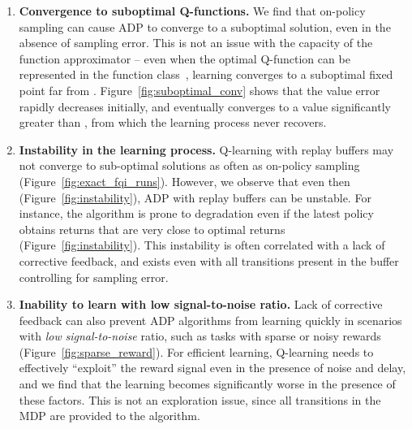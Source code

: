 \documentclass[jmlr]{article}
\begin{document}
\begin{enumerate}
\item \textbf{Convergence to suboptimal Q-functions.} We find that on-policy sampling can cause ADP to converge to a suboptimal
solution, even in the absence of sampling error. {This is not an issue with the capacity of the function approximator -- even when the optimal Q-function  can be represented in the function class~\citep{fu19diagnosing}, learning converges to a suboptimal fixed point far from .} 
Figure~\ref{fig:suboptimal_conv} shows that the value error  rapidly decreases initially, and eventually converges to a value significantly greater than , from which the learning process never recovers. 


\item \textbf{Instability in the learning process.}
Q-learning with replay buffers may not converge to sub-optimal solutions as often as on-policy sampling (Figure~\ref{fig:exact_fqi_runs}). However, we observe that even then (Figure~\ref{fig:instability}), ADP with replay buffers can be
unstable. {For instance, the algorithm is prone to degradation even if the latest policy obtains returns that are very close to optimal returns  (Figure~\ref{fig:instability}).} This instability is often correlated with a lack of corrective feedback, and exists even with all transitions present in the buffer controlling for sampling error. 

\item \textbf{Inability to learn with low signal-to-noise ratio.} 
Lack of corrective feedback can also prevent ADP algorithms from learning quickly in scenarios with \textit{low} \textit{signal-to-noise}
ratio, such as tasks with sparse or noisy rewards (Figure~\ref{fig:sparse_reward}). For efficient learning, Q-learning needs to effectively ``exploit'' the reward signal even in the presence of noise and delay, and we find that the learning becomes significantly worse in the presence of these factors. {This is not an exploration issue, since all transitions in the MDP are provided to the algorithm}.
\end{enumerate}
\end{document}
